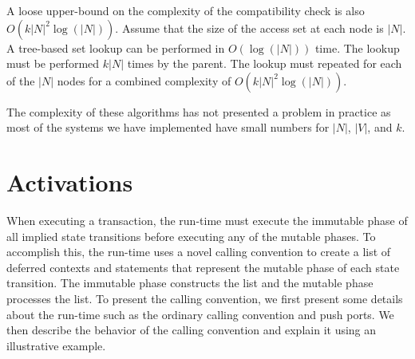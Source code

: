 A loose upper-bound on the complexity of the compatibility check is also $O(k |N|^2 \log (|N|))$.
Assume that the size of the access set at each node is $|N|$.
A tree-based set lookup can be performed in $O(\log(|N|))$ time.
The lookup must be performed $k |N|$ times by the parent.
The lookup must repeated for each of the $|N|$ nodes for a combined complexity of $O(k |N|^2 \log (|N|))$.

The complexity of these algorithms has not presented a problem in practice as most of the systems we have implemented have small numbers for $|N|$, $|V|$, and $k$.

\section{Activations}

When executing a transaction, the run-time must execute the immutable phase of all implied state transitions before executing any of the mutable phases.
To accomplish this, the run-time uses a novel calling convention to create a list of deferred contexts and statements that represent the mutable phase of each state transition.
The immutable phase constructs the list and the mutable phase processes the list.
To present the calling convention, we first present some details about the run-time such as the ordinary calling convention and push ports.
We then describe the behavior of the calling convention and explain it using an illustrative example.

